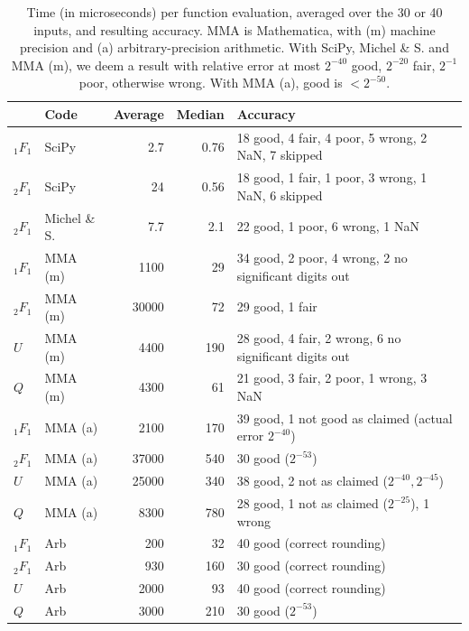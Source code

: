 \documentclass[review,nohypdvips]{siamart0216}
\begin{document}
\begin{table}
\renewcommand{\arraystretch}{1.4}
\setlength{\tabcolsep}{.4em}
\begin{center}
\caption{Time (in microseconds) per function evaluation, averaged over the 30 or 40 inputs, and resulting accuracy.
MMA is Mathematica, with (m) machine precision and (a) arbitrary-precision arithmetic.
With SciPy, Michel \& S. and MMA (m), we deem a result with relative error at most $2^{-40}$ good,
$2^{-20}$ fair, $2^{-1}$ poor, otherwise wrong. With MMA (a), good is $<2^{-50}$.}
\begin{scriptsize}
\begin{tabular}{l l | r r | l}
          & Code & Average & Median   & Accuracy \\
\hline
${}_1F_1$ & SciPy         & 2.7 & 0.76         & 18 good, 4 fair, 4 poor, 5 wrong, 2 NaN, 7 skipped\\
${}_2F_1$ & SciPy         & 24   & 0.56        & 18 good, 1 fair, 1 poor, 3 wrong, 1 NaN, 6 skipped \\
\hline
${}_2F_1$ & Michel \& S.  & 7.7  & 2.1 & 22 good, 1 poor, 6 wrong, 1 NaN \\
\hline
${}_1F_1$ & MMA (m)       & 1100      &     29 & 34 good, 2 poor, 4 wrong, 2 no significant digits out \\
${}_2F_1$ & MMA (m)       & 30000     &     72   & 29 good, 1 fair \\

$U$       & MMA (m)       & 4400      & 190   &  28 good, 4 fair, 2 wrong, 6 no significant digits out \\
$Q$       & MMA (m)       & 4300      &   61  &  21 good, 3 fair, 2 poor, 1 wrong, 3 NaN \\
\hline
${}_1F_1$ & MMA (a)       & 2100      & 170   & 39 good, 1 not good as claimed (actual error $2^{-40}$) \\
${}_2F_1$ & MMA (a)       & 37000     & 540   & 30 good ($2^{-53}$) \\
$U$       & MMA (a)       & 25000     & 340   & 38 good, 2 not as claimed ($2^{-40}, 2^{-45}$) \\
$Q$       & MMA (a)       & 8300      & 780   & 28 good, 1 not as claimed ($2^{-25}$), 1 wrong \\
\hline
${}_1F_1$ & Arb           &  200      & 32    & 40 good (correct rounding) \\
${}_2F_1$ & Arb           &  930      & 160   & 30 good (correct rounding) \\
$U$       & Arb           & 2000      & 93    & 40 good (correct rounding) \\
$Q$       & Arb           & 3000      & 210   & 30 good ($2^{-53}$) \\
\end{tabular}
\end{scriptsize}
\label{tab:pearson2}
\end{center}
\end{table}
\end{document}

